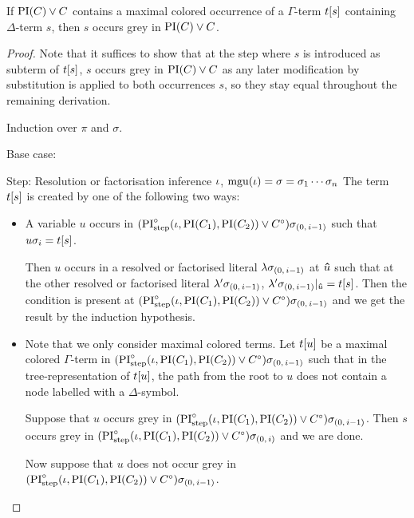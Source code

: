 \documentclass[,%
	draft=false,%
	numbers=noendperiod
	12pt,
	a4paper,
	oneside,%
	openany,
]{memoir}
\begin{document}
\begin{clemma}
	If ${\operatorname{PI}(C) \lor C}$ contains a maximal colored occurrence of a $\Gamma$-term $t[s]$ containing $\Delta$-term $s$, then 
	$s$ occurs grey in $\operatorname{PI}(C) \lor C$.
\end{clemma}
\begin{proof}
	Note that it suffices to show that at the step where $s$ is introduced as subterm of $t[s]$, $s$ occurs grey in $\operatorname{PI}(C) \lor C$ as any later modification by substitution is applied to both occurrences $s$, so they stay equal throughout the remaining derivation. 
	\medskip

	\noindent
	Induction over $\pi$ and $\sigma$.
	\medskip

	\noindent
	Base case: \checkmark
	\medskip

	\noindent
	Step:
	Resolution or factorisation inference $\iota$, $\operatorname{mgu}(\iota) = \sigma = \sigma_1\cdots\sigma_n$ 
	The term $t[s]$ is created by one of the following two ways: 
	\begin{itemize}
		\item
			A variable $u$ occurs in $(\operatorname{PI}^\circ_{\mathrm{step}}(\iota, \operatorname{PI}(C_1), \operatorname{PI}(C_2)) \lor C^\circ)\sigma_{(0,\,i-1)}$ such that $u\sigma_i = t[s]$.

			Then $u$ occurs in a resolved or factorised literal $\lambda\sigma_{(0,\,i-1)}$ at $\bm\hat u$ such that at the other resolved or factorised literal $\lambda'\sigma_{(0,\,i-1)}$, $\lambda'\sigma_{(0,\,i-1)}|_{\bm\hat u} = t[s]$.
			Then the condition is present at $(\operatorname{PI}^\circ_{\mathrm{step}}(\iota, \operatorname{PI}(C_1), \operatorname{PI}(C_2)) \lor C^\circ)\sigma_{(0,\,i-1)}$ and we get the result by the induction hypothesis.

		\item 
			Note that we only consider maximal colored terms.
			 Let $t[u]$ be a maximal colored $\Gamma$-term in $(\operatorname{PI}^\circ_{\mathrm{step}}(\iota, \operatorname{PI}(C_1), \operatorname{PI}(C_2)) \lor C^\circ)\sigma_{(0,\,i-1)}$ such that in the tree-representation of $t[u]$, the path from the root to $u$ does not contain a node labelled with a $\Delta$-symbol.

			Suppose that $u$ occurs grey in $(\operatorname{PI}^\circ_{\mathrm{step}}(\iota, \operatorname{PI}(C_1), \operatorname{PI}(C_2)) \lor C^\circ)\sigma_{(0,\,i-1)}$.
			Then $s$ occurs grey in $(\operatorname{PI}^\circ_{\mathrm{step}}(\iota, \operatorname{PI}(C_1), \operatorname{PI}(C_2)) \lor C^\circ)\sigma_{(0,\,i)}$ and we are done.

			Now suppose that $u$ does not occur grey in $(\operatorname{PI}^\circ_{\mathrm{step}}(\iota, \operatorname{PI}(C_1), \operatorname{PI}(C_2)) \lor C^\circ)\sigma_{(0,\,i-1)}$.





	\end{itemize}

\end{proof}
\end{document}
